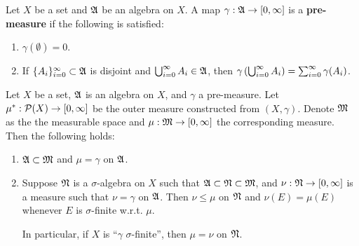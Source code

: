 \documentclass[a4paper]{article}
\begin{document}
\begin{defi}
Let $X$ be a set and $\mathfrak{A}$ be an algebra on $X$. A map 
$\gamma: \mathfrak{A} \to [0, \infty]$ is a \textbf{pre-measure}
if the following is satisfied:
\begin{enumerate}
  \item $\gamma(\emptyset) = 0$. 
  \item If $\{ A_i \}_{i=0}^\infty \subset \mathfrak{A}$ is disjoint and 
  $\bigcup_{i=0}^\infty A_i \in \mathfrak{A}$, then $\gamma \left( \bigcup_{i=0}^\infty A_i \right)
  = \sum_{i=0}^\infty \gamma(A_i)$.
\end{enumerate}

\end{defi}

\begin{thm}
Let $X$ be a set, $\mathfrak{A}$ is an algebra on $X$, and 
$\gamma$ a pre-measure. Let $\mu^* : \mathcal{P} (X) \to [0, \infty]$
be the outer measure constructed from $(X, \gamma)$.
Denote $\mathfrak{M}$ as the the measurable space and 
$\mu: \mathfrak{M} \to [0, \infty]$ the corresponding measure.
Then the following holds: 
\begin{enumerate}
  \item $\mathfrak{A} \subset \mathfrak{M}$ and $\mu = \gamma$ on $\mathfrak{A}$.
  
  \item Suppose $\mathfrak{N}$ is a $\sigma$-algebra on $X$ 
  such that $\mathfrak{A} \subset \mathfrak{N} \subset \mathfrak{M}$, and 
  $\nu: \mathfrak{N} \to [0, \infty]$ is a measure such that 
  $\nu = \gamma$ on $\mathfrak{A}$. Then $\nu \leq \mu$ on $\mathfrak{N}$
  and $\nu(E) = \mu(E)$ whenever $E$ is $\sigma$-finite 
  w.r.t. $\mu$. 
  
  In particular, if $X$ is ``$\gamma$ $\sigma$-finite'',
  then $\mu = \nu$ on $\mathfrak{N}$.
\end{enumerate}
\end{thm}
\end{document}
